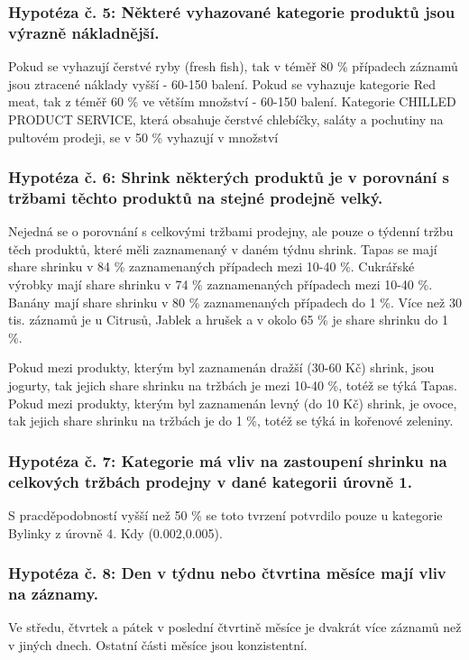 \subsubsection*{Hypotéza č. 5: Některé vyhazované kategorie produktů jsou výrazně nákladnější.}

Pokud se vyhazují čerstvé ryby (fresh fish), tak v téměř 80 \% případech záznamů jsou ztracené náklady vyšší  - 60-150 balení.
Pokud se vyhazuje kategorie Red meat, tak z téměř 60 \% ve větším množství - 60-150 balení.
Kategorie CHILLED PRODUCT SERVICE, která obsahuje čerstvé chlebíčky, saláty a pochutiny na pultovém prodeji, se v 50 \% vyhazují v množství

\subsubsection*{Hypotéza č. 6: Shrink některých produktů je v porovnání s tržbami těchto produktů na stejné prodejně velký.}

Nejedná se o porovnání s celkovými tržbami prodejny, ale pouze o týdenní tržbu těch produktů, které měli zaznamenaný v daném týdnu shrink.
Tapas se mají share shrinku v 84 \% zaznamenaných případech mezi 10-40 \%.
 Cukrářské výrobky  mají share shrinku v 74 \% zaznamenaných případech mezi 10-40 \%.
 Banány mají share shrinku v 80 \% zaznamenaných případech do 1 \%.
 Více než 30 tis. záznamů je u Citrusů, Jablek a hrušek a v okolo 65 \% je share shrinku do 1 \%.

 Pokud mezi produkty, kterým byl zaznamenán dražší (30-60 Kč) shrink, jsou jogurty, tak jejich share shrinku na tržbách je mezi 10-40 \%, totéž se týká Tapas.
Pokud mezi produkty, kterým byl zaznamenán levný (do 10 Kč) shrink, je ovoce, tak jejich share shrinku na tržbách je do 1 \%, totéž se týká in kořenové zeleniny.

\subsubsection*{Hypotéza č. 7: Kategorie má vliv na zastoupení shrinku na celkových tržbách prodejny v dané kategorii úrovně 1.}

S pracděpodobností vyšší než 50 \% se toto tvrzení potvrdilo pouze u kategorie Bylinky z úrovně 4. Kdy (0.002,0.005).

\subsubsection*{Hypotéza č. 8: Den v týdnu nebo čtvrtina měsíce mají vliv na záznamy.}

Ve středu, čtvrtek a pátek v poslední čtvrtině měsíce je dvakrát více záznamů než v jiných dnech. Ostatní části měsíce jsou konzistentní.